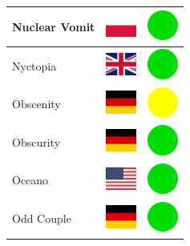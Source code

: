 \documentclass[12pt, a4paper, twoside]{report}
\begin{document}
\begin{center}
\begin{longtable}{|p{5cm}|p{2cm}|p{2cm}|}
 Nuclear Vomit                                              & \includegraphics[width=1cm]{../4x3/pl} &   \includegraphics[width=1cm]{../likes/y} \\ \hline
 Nyctopia                                                   & \includegraphics[width=1cm]{../4x3/gb} &   \includegraphics[width=1cm]{../likes/y} \\ \hline
 Obscenity                                                  & \includegraphics[width=1cm]{../4x3/de} &   \includegraphics[width=1cm]{../likes/m} \\ \hline
 Obscurity                                                  & \includegraphics[width=1cm]{../4x3/de} &   \includegraphics[width=1cm]{../likes/y} \\ \hline
 Oceano                                                     & \includegraphics[width=1cm]{../4x3/us} &   \includegraphics[width=1cm]{../likes/y} \\ \hline
 Odd Couple                                                 & \includegraphics[width=1cm]{../4x3/de} &   \includegraphics[width=1cm]{../likes/y} \\ \hline

\end{longtable}
\end{center}
\end{document}
